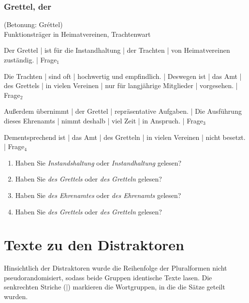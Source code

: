 \subsubsection*{Grettel, der}
(Betonung: Gréttel) \\ Funktionsträger in Heimatvereinen, Trachtenwart
\begin{SchmittAppendixList}
\item Der Grettel | ist für die Instandhaltung | der Trachten | von Heimatvereinen zuständig. | Frage$_1$   
\item Die Trachten  | sind oft | hochwertig und empfindlich. | Deswegen ist | das Amt | des Grettels | in vielen Vereinen | nur für langjährige Mitglieder | vorgesehen. | Frage$_2$  
\item Außerdem übernimmt | der Grettel | repräsentative Aufgaben. | Die Ausführung dieses Ehrenamts | nimmt deshalb | viel Zeit | in Anspruch. | Frage$_3$ 
\item Dementsprechend ist | das Amt | des Gretteln | in vielen Vereinen | nicht besetzt. | Frage$_4$ 
\end{SchmittAppendixList}

\begin{enumerate}
\item Haben Sie \textit{Instandshaltung} oder \textit{Instandhaltung} gelesen?  
\item Haben Sie \textit{des Grettels} oder \textit{des Gretteln} gelesen?
\item Haben Sie \textit{des Ehrenamtes} oder \textit{des Ehrenamts} gelesen? 
\item Haben Sie \textit{des Grettels} oder \textit{des Gretteln} gelesen? 
\end{enumerate}

\section{Texte zu den Distraktoren}
\label{distraktorself}

\begin{sloppypar}
Hinsichtlich der Distraktoren wurde die Reihenfolge der Pluralformen nicht pseudorandomisiert, sodass beide Gruppen identische Texte lasen. Die senkrechten Striche (|) markieren die Wortgruppen, in die die Sätze geteilt wurden.
\end{sloppypar}

